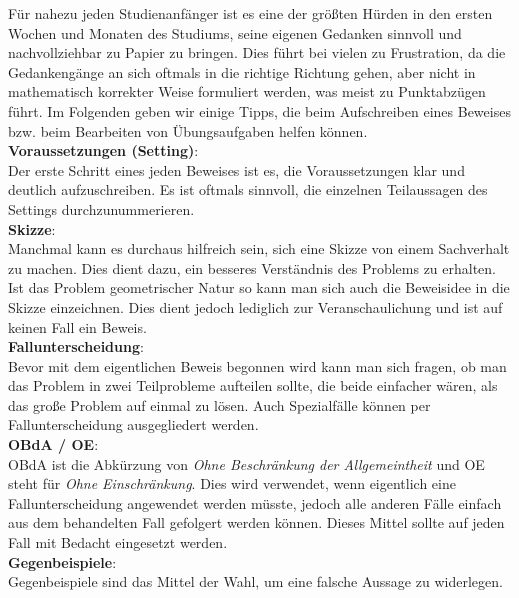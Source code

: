 Für nahezu jeden Studienanfänger ist es eine der größten Hürden in den ersten
Wochen und Monaten des Studiums, seine eigenen Gedanken sinnvoll und
nachvollziehbar zu Papier zu bringen.
Dies führt bei vielen zu Frustration, da die Gedankengänge an sich oftmals in
die richtige Richtung gehen, aber nicht in mathematisch korrekter Weise
formuliert werden, was meist zu Punktabzügen führt.
Im Folgenden geben wir einige Tipps, die beim Aufschreiben eines Beweises bzw.
beim Bearbeiten von Übungsaufgaben helfen können. \\

\textbf{Voraussetzungen (Setting)}: \\
Der erste Schritt eines jeden Beweises ist es, die Voraussetzungen klar und
deutlich aufzuschreiben.
Es ist oftmals sinnvoll, die einzelnen Teilaussagen des Settings
durchzunummerieren. \\

\textbf{Skizze}: \\
Manchmal kann es durchaus hilfreich sein, sich eine Skizze von einem
Sachverhalt zu machen.
Dies dient dazu, ein besseres Verständnis des Problems zu erhalten.
Ist das Problem geometrischer Natur so kann man sich auch die Beweisidee in die
Skizze einzeichnen.
Dies dient jedoch lediglich zur Veranschaulichung und ist auf keinen Fall ein
Beweis. \\

\textbf{Fallunterscheidung}: \\
Bevor mit dem eigentlichen Beweis begonnen wird kann man sich fragen, ob man
das Problem in zwei Teilprobleme aufteilen sollte, die beide einfacher wären,
als das große Problem auf einmal zu lösen.
Auch Spezialfälle können per Fallunterscheidung ausgegliedert werden. \\

\textbf{OBdA / OE}: \\
OBdA ist die Abkürzung von \textit{Ohne Beschränkung der Allgemeintheit} und
OE steht für \textit{Ohne Einschränkung}.
Dies wird verwendet, wenn eigentlich eine Fallunterscheidung angewendet werden
müsste, jedoch alle anderen Fälle einfach aus dem behandelten Fall gefolgert
werden können.
Dieses Mittel sollte auf jeden Fall mit Bedacht eingesetzt werden. \\

\textbf{Gegenbeispiele}: \\
Gegenbeispiele sind das Mittel der Wahl, um eine falsche Aussage zu widerlegen.
\newline

